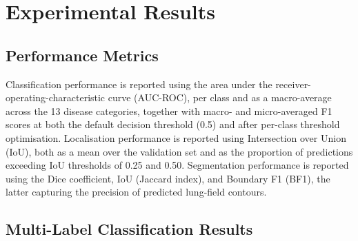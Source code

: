 \documentclass[preprint,12pt,authoryear]{elsarticle}
\begin{document}
\section{Experimental Results}
\label{sec:results}

\subsection{Performance Metrics}

Classification performance is reported using the area under the receiver-operating-characteristic curve (AUC-ROC), per class and as a macro-average across the 13 disease categories, together with macro- and micro-averaged F1 scores at both the default decision threshold (0.5) and after per-class threshold optimisation. Localisation performance is reported using Intersection over Union (IoU), both as a mean over the validation set and as the proportion of predictions exceeding IoU thresholds of 0.25 and 0.50. Segmentation performance is reported using the Dice coefficient, IoU (Jaccard index), and Boundary F1 (BF1), the latter capturing the precision of predicted lung-field contours.

\subsection{Multi-Label Classification Results}
\end{document}
